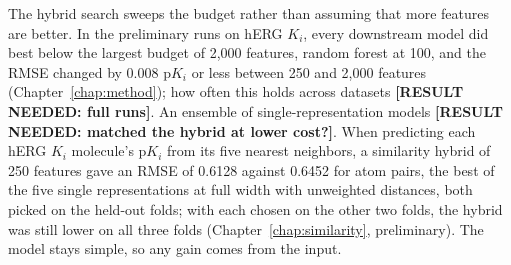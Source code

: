The hybrid search sweeps the budget rather than assuming that more features are better. In the preliminary runs on hERG $K_i$, every downstream model did best below the largest budget of 2,000 features, random forest at 100, and the RMSE changed by 0.008 p$K_i$ or less between 250 and 2,000 features (Chapter~\ref{chap:method}); how often this holds across datasets \textbf{[RESULT NEEDED: full runs]}. An ensemble of single-representation models \textbf{[RESULT NEEDED: matched the hybrid at lower cost?]}. When predicting each hERG $K_i$ molecule's p$K_i$ from its five nearest neighbors, a similarity hybrid of 250 features gave an RMSE of 0.6128 against 0.6452 for atom pairs, the best of the five single representations at full width with unweighted distances, both picked on the held-out folds; with each chosen on the other two folds, the hybrid was still lower on all three folds (Chapter~\ref{chap:similarity}, preliminary). The model stays simple, so any gain comes from the input.

